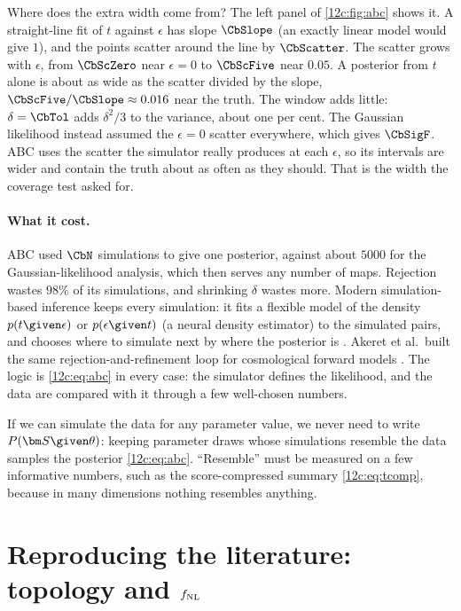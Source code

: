 Where does the extra width come from? The left panel of \cref{12c:fig:abc} shows it. A straight-line fit of $t$ against $\epsilon$ has
slope $\CbSlope$ (an exactly linear model would give $1$), and the points scatter around the line by $\CbScatter$. The scatter grows with
$\epsilon$, from $\CbScZero$ near $\epsilon=0$ to $\CbScFive$ near $0.05$. A posterior from $t$ alone is about as wide as the scatter
divided by the slope, $\CbScFive/\CbSlope\approx0.016$ near the truth. The window adds little: $\delta=\CbTol$ adds $\delta^2/3$ to the
variance, about one per cent. The Gaussian likelihood instead assumed the $\epsilon=0$ scatter everywhere, which gives $\CbSigF$. ABC
uses the scatter the simulator really produces at each $\epsilon$, so its intervals are wider and contain the truth about as often as they
should. That is the width the coverage test asked for.

\paragraph{What it cost.} ABC used $\CbN$ simulations to give one posterior, against about $5000$ for the Gaussian-likelihood analysis,
which then serves any number of maps. Rejection wastes $98\%$ of its simulations, and shrinking $\delta$ wastes more. Modern
simulation-based inference keeps every simulation: it fits a flexible model of the density $p(t\given\epsilon)$ or $p(\epsilon\given t)$
(a neural density estimator) to the simulated pairs, and chooses where to simulate next by where the posterior is
\cite{Alsing2019}. Akeret et al.\ built the same rejection-and-refinement loop for cosmological forward models \cite{Akeret2015}. The logic
is \eqref{12c:eq:abc} in every case: the simulator defines the likelihood, and the data are compared with it through a few
well-chosen numbers.

\begin{keyidea}
If we can simulate the data for any parameter value, we never need to write $P(\bm S\given\theta)$: keeping parameter draws whose
simulations resemble the data samples the posterior \eqref{12c:eq:abc}. ``Resemble'' must be measured on a few informative numbers,
such as the score-compressed summary \eqref{12c:eq:tcomp}, because in many dimensions nothing resembles anything.
\end{keyidea}
\section{Reproducing the literature: topology and $f_{\rm NL}$}
\label{12c:sec:repro}

